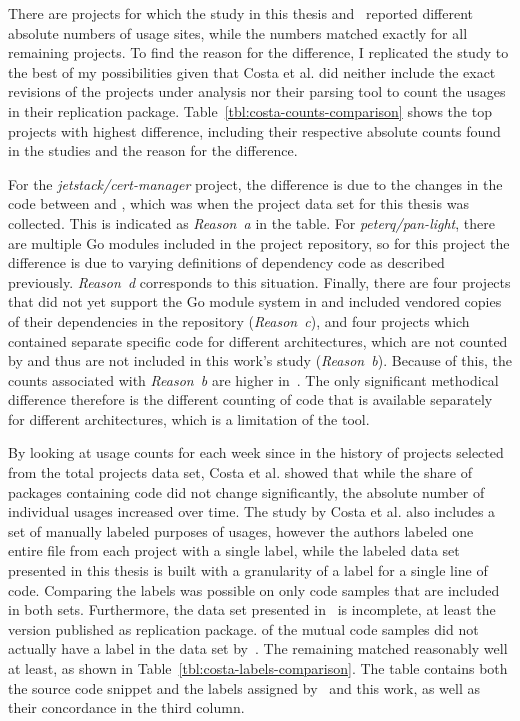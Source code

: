 There are  projects for which the study in this thesis and~\cite{costa2020} reported different absolute
numbers of \unsafe{} usage sites, while the numbers matched exactly for all remaining projects.
To find the reason for the difference, I replicated the study to the best of my possibilities given that Costa et al.
did neither include the exact revisions of the projects under analysis nor their parsing tool to count the \unsafe{}
usages in their replication package.
Table~\ref{tbl:costa-counts-comparison} shows the top  projects with highest difference, including their
respective absolute counts found in the studies and the reason for the difference.



For the \textit{jetstack/cert-manager} project, the difference is due to the changes in the code between
 and , which was when the project data set for this thesis was collected.
This is indicated as \textit{Reason~a} in the table.
For \textit{peterq/pan-light}, there are multiple Go modules included in the project repository, so for this project
the difference is due to varying definitions of dependency code as described previously.
\textit{Reason~d} corresponds to this situation.
Finally, there are four projects that did not yet support the Go module system in  and included
vendored copies of their dependencies in the repository (\textit{Reason~c}), and four projects which contained separate
specific code for different architectures, which are not counted by \toolGeiger{} and thus are not included in this
work's study (\textit{Reason~b}).
Because of this, the counts associated with \textit{Reason~b} are higher in~\cite{costa2020}.
The only significant methodical difference therefore is the different counting of code that is available separately for
different architectures, which is a limitation of the \toolGeiger{} tool.

By looking at \unsafe{} usage counts for each week since  in the history of  projects
selected from the total projects data set, Costa et al. showed that while the share of packages containing \unsafe{}
code did not change significantly, the absolute number of individual \unsafe{} usages increased over time.
The study by Costa et al. also includes a set of manually labeled purposes of \unsafe{} usages, however the authors
labeled one entire file from each project with a single label, while the labeled data set presented in this thesis is
built with a granularity of a label for a single line of code.
Comparing the labels was possible on only  code samples that are included in both sets.
Furthermore, the data set presented in~\cite{costa2020} is incomplete, at least the version published as replication
package.
 of the  mutual code samples did not actually have a label in the data set
by~\cite{costa2020}.
The remaining  matched reasonably well at least, as shown in Table~\ref{tbl:costa-labels-comparison}.
The table contains both the source code snippet and the labels assigned by~\cite{costa2020} and this work, as well as
their concordance in the third column.

